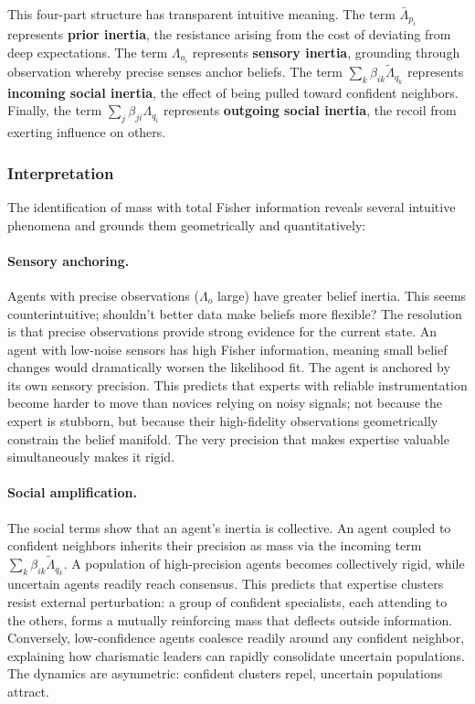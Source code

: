 \documentclass[12pt]{article}
\begin{document}
This four-part structure has transparent intuitive meaning. The term $\bar{\Lambda}_{p_i}$ represents \textbf{prior inertia}, the resistance arising from the cost of deviating from deep expectations. The term $\Lambda_{o_i}$ represents \textbf{sensory inertia}, grounding through observation whereby precise senses anchor beliefs. The term $\sum_k \beta_{ik}\tilde{\Lambda}_{q_k}$ represents \textbf{incoming social inertia}, the effect of being pulled toward confident neighbors. Finally, the term $\sum_j \beta_{ji}\Lambda_{q_i}$ represents \textbf{outgoing social inertia}, the recoil from exerting influence on others.

\subsubsection{Interpretation}

The identification of mass with total Fisher information reveals several intuitive phenomena and grounds them geometrically and quantitatively:

\paragraph{Sensory anchoring.} Agents with precise observations ($\Lambda_o$ large) have greater belief inertia. This seems counterintuitive; shouldn't better data make beliefs more flexible? The resolution is that precise observations provide strong evidence for the current state. An agent with low-noise sensors has high Fisher information, meaning small belief changes would dramatically worsen the likelihood fit. The agent is anchored by its own sensory precision. This predicts that experts with reliable instrumentation become harder to move than novices relying on noisy signals; not because the expert is stubborn, but because their high-fidelity observations geometrically constrain the belief manifold. The very precision that makes expertise valuable simultaneously makes it rigid.

 
\paragraph{Social amplification.} The social terms show that an agent's inertia is collective. An agent coupled to confident neighbors inherits their precision as mass via the incoming term $\sum_k \beta_{ik}\tilde{\Lambda}_{q_k}$. A population of high-precision agents becomes collectively rigid, while uncertain agents readily reach consensus. This predicts that expertise clusters resist external perturbation: a group of confident specialists, each attending to the others, forms a mutually reinforcing mass that deflects outside information. Conversely, low-confidence agents coalesce readily around any confident neighbor, explaining how charismatic leaders can rapidly consolidate uncertain populations. The dynamics are asymmetric: confident clusters repel, uncertain populations attract.
\end{document}
